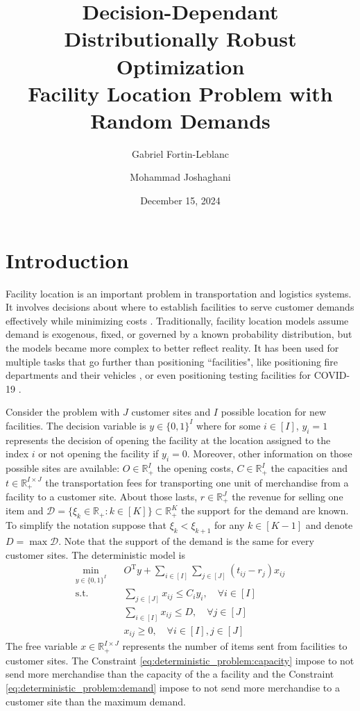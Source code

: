 \documentclass[12pt, letterpaper]{article}
\title{
	Decision-Dependant Distributionally Robust Optimization \\
	\large Facility Location Problem with Random Demands
}
\author[1]{Gabriel Fortin-Leblanc}
\author[2]{Mohammad Joshaghani}
\affil[1]{Université de Montréal}
\affil[2]{Université du Québec à Montréal}
\date{December 15, 2024}
\newcommand{\R}{\mathbb{R}}
\newcommand{\T}{\mathrm{T}}
\newcommand{\Dcal}{\mathcal{D}}
\begin{document}
	\maketitle
	\tableofcontents
	\newpage
	
	\section*{Introduction}
	Facility location is an important problem in transportation and logistics systems. It involves decisions about where to establish facilities to serve customer demands effectively while minimizing costs \cite{cornuejols_uncapicitated_1983}. Traditionally, facility location models assume demand is exogenous, fixed, or governed by a known probability distribution, but the models became more complex to better reflect reality. It has been used for multiple tasks that go further than positioning ``facilities", like positioning fire departments and their vehicles \cite{rodriguez_simulation-optimization_2021}, or even positioning testing facilities for COVID-19 \cite{liu_testing_2023}.
	
	Consider the problem with $J$ customer sites and $I$ possible location for new facilities. The decision variable is $y \in \{0, 1\}^I$ where for some $i \in [I]$, $y_i = 1$ represents the decision of opening the facility at the location assigned to the index $i$ or not opening the facility if $y_i = 0$. Moreover, other information on those possible sites are available: $O \in \R_+^I$ the opening costs, $C \in \R_+^I$ the capacities and $t \in \R_+^{I \times J}$ the transportation fees for transporting one unit of merchandise from a facility to a customer site. About those lasts, $r \in \R_+^J$ the revenue for selling one item and $\Dcal = \{\xi_k \in \R_+: k \in [K]\} \subset \R_+^K$ the support for the demand are known. To simplify the notation suppose that $\xi_k < \xi_{k+1}$ for any $k \in [K-1]$ and denote $D = \max \Dcal$. Note that the support of the demand is the same for every customer sites. The deterministic model is
	\begin{subequations} \label{eq:deterministic_problem}
		\begin{align}
			\min_{y \in \{0, 1\}^I} &\quad O^\T y + \sum_{i \in [I]} \sum_{j \in [J]} (t_{ij} - r_j) x_{ij} \\
			\text{s.t.} &\quad \sum_{j \in [J]} x_{ij} \le C_i y_i, \quad \forall i \in [I] \\ \label{eq:deterministic_problem:capacity}
			&\quad \sum_{i \in [I]} x_{ij} \le D, \quad \forall j \in [J] \\ \label{eq:deterministic_problem:demand}
			&\quad x_{ij} \ge 0, \quad \forall i \in [I], j \in [J]
		\end{align}
	\end{subequations}
	The free variable $x \in \R_+^{I \times J}$ represents the number of items sent from facilities to customer sites. The Constraint \eqref{eq:deterministic_problem:capacity} impose to not send more merchandise than the capacity of the a facility and the Constraint \eqref{eq:deterministic_problem:demand} impose to not send more merchandise to a customer site than the maximum demand.
	
\end{document}
